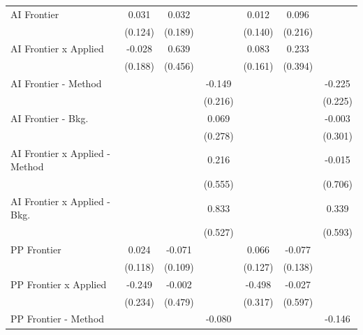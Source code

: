 \begin{tabular}{lcccccc}
   AI Frontier                    & 0.031         & 0.032        &         & 0.012         & 0.096   &   \\   
                                  & (0.124)       & (0.189)      &         & (0.140)       & (0.216) &   \\   
   AI Frontier x Applied          & -0.028        & 0.639        &         & 0.083         & 0.233   &   \\   
                                  & (0.188)       & (0.456)      &         & (0.161)       & (0.394) &   \\   
   AI Frontier - Method           &               &              & -0.149  &               &         & -0.225\\   
                                  &               &              & (0.216) &               &         & (0.225)\\   
   AI Frontier - Bkg.             &               &              & 0.069   &               &         & -0.003\\   
                                  &               &              & (0.278) &               &         & (0.301)\\   
   AI Frontier x Applied - Method &               &              & 0.216   &               &         & -0.015\\   
                                  &               &              & (0.555) &               &         & (0.706)\\   
   AI Frontier x Applied - Bkg.   &               &              & 0.833   &               &         & 0.339\\   
                                  &               &              & (0.527) &               &         & (0.593)\\   
   PP Frontier                    & 0.024         & -0.071       &         & 0.066         & -0.077  &   \\   
                                  & (0.118)       & (0.109)      &         & (0.127)       & (0.138) &   \\   
   PP Frontier x Applied          & -0.249        & -0.002       &         & -0.498        & -0.027  &   \\   
                                  & (0.234)       & (0.479)      &         & (0.317)       & (0.597) &   \\   
   PP Frontier - Method           &               &              & -0.080  &               &         & -0.146\\   

\end{tabular}
